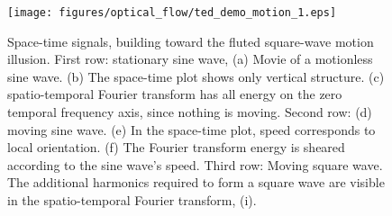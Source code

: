 \begin{figure}
    \centerline{
        \texttt{[image: figures/optical\_flow/ted\_demo\_motion\_1.eps]}
    }
    \caption{Space-time signals, building toward the fluted square-wave motion illusion.    First row: stationary sine wave, (a) Movie of a motionless sine wave. (b) The space-time plot shows only vertical structure.
        (c) spatio-temporal Fourier transform has all energy on the zero temporal frequency axis, since nothing is moving.
        Second row:  (d) moving sine wave. (e) In the space-time plot, speed corresponds to local orientation. (f) The Fourier transform energy is sheared according to the sine wave's speed.
        Third row:  Moving square wave.  The additional harmonics required to form a square wave are visible in the spatio-temporal Fourier transform, (i).}
    \label{fig:motionIllusion1}
\end{figure}



